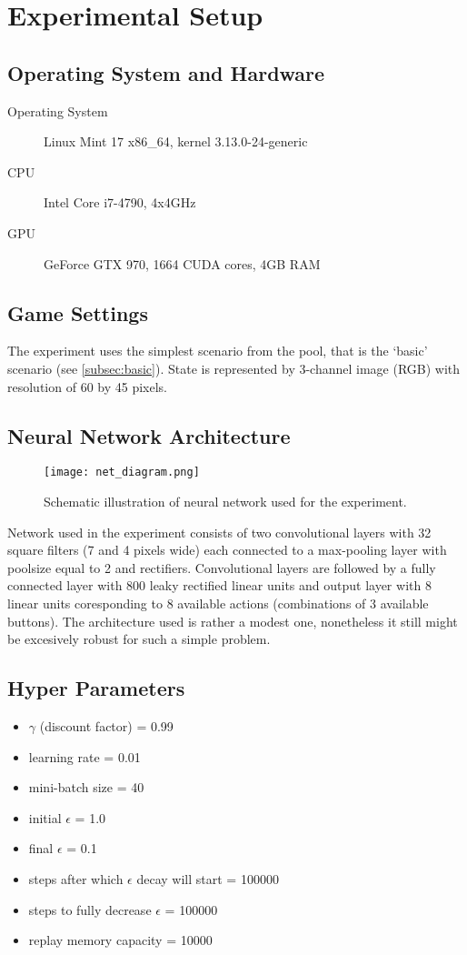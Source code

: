 \newpage
\section{Experimental Setup} 
	\subsection{Operating System and Hardware}
	\begin{description}
		\item[Operating System] Linux Mint 17 x86\_64, kernel 3.13.0-24-generic
		\item[CPU] Intel Core i7-4790, 4x4GHz
		\item[GPU] GeForce GTX 970, 1664 CUDA cores, 4GB RAM
	\end{description}

	\subsection{Game Settings}
		The experiment uses the simplest scenario from the pool, that is the `basic' scenario (see \ref{subsec:basic}). State is represented by 3-channel image (RGB) with resolution of 60 by 45 pixels.

	\subsection{Neural Network Architecture}
		\begin{figure}
			\centering
			\texttt{[image: net\_diagram.png]}
			\caption{Schematic illustration of neural network used for the experiment.}\label{fig:network}
		\end{figure}
		 Network used in the experiment consists of two convolutional layers with 32 square filters (7 and 4 pixels wide) each connected to a max-pooling layer with poolsize equal to 2 and rectifiers. Convolutional layers are followed by a fully connected layer with 800 leaky rectified linear units and output layer with 8 linear units coresponding to 8 available actions (combinations of 3 available buttons). The architecture used is rather a modest one, nonetheless it still might be excesively robust for such a simple problem.
	
	\subsection{Hyper Parameters}
		\begin{itemize}
		\item $\gamma$ (discount factor) = 0.99
		\item learning rate = 0.01
		\item mini-batch size = 40
		\item initial $\epsilon$ = 1.0
		\item final $\epsilon$ = 0.1
		\item steps after which $\epsilon$ decay will start = 100000
		\item steps to fully decrease $\epsilon$ = 100000
		\item replay memory  capacity = 10000
		\end{itemize}
	

